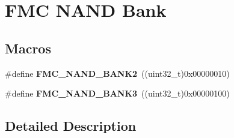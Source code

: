 \hypertarget{group___f_m_c___n_a_n_d___bank}{}\section{F\+MC N\+A\+ND Bank}
\label{group___f_m_c___n_a_n_d___bank}
\subsection*{Macros}
\begin{DoxyCompactItemize}
\item 
\#define {\bfseries F\+M\+C\+\_\+\+N\+A\+N\+D\+\_\+\+B\+A\+N\+K2}~((uint32\+\_\+t)0x00000010)\hypertarget{group___f_m_c___n_a_n_d___bank_gae88d741ea0b20db4e7271f7a1abba4bb}{}\label{group___f_m_c___n_a_n_d___bank_gae88d741ea0b20db4e7271f7a1abba4bb}

\item 
\#define {\bfseries F\+M\+C\+\_\+\+N\+A\+N\+D\+\_\+\+B\+A\+N\+K3}~((uint32\+\_\+t)0x00000100)\hypertarget{group___f_m_c___n_a_n_d___bank_gaaabc5218c166c52562406f42a7a116d6}{}\label{group___f_m_c___n_a_n_d___bank_gaaabc5218c166c52562406f42a7a116d6}

\end{DoxyCompactItemize}


\subsection{Detailed Description}
